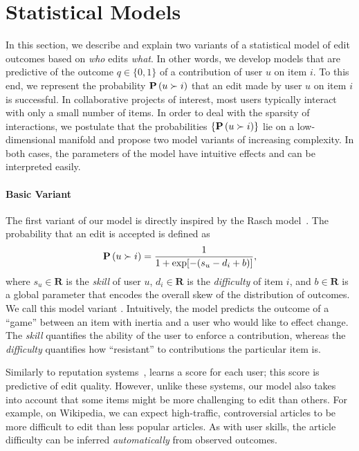 \section{Statistical Models}
\label{pps:sec:models}

In this section, we describe and explain two variants of a statistical model of edit outcomes based on \emph{who} edits \emph{what}.
In other words, we develop models that are predictive of the outcome $q \in \{0, 1\}$ of a contribution of user $u$ on item $i$.
To this end, we represent the probability $\mathbf{P}\left( u \succ i \right)$ that an edit made by user $u$ on item $i$ is successful.
In collaborative projects of interest, most users typically interact with only a small number of items.
In order to deal with the sparsity of interactions, we postulate that the probabilities $\{ \mathbf{P}\left( u \succ i \right) \}$ lie on a low-dimensional manifold and propose two model variants of increasing complexity.
In both cases, the parameters of the model have intuitive effects and can be interpreted easily.

\paragraph{Basic Variant}
The first variant of our model is directly inspired by the Rasch model~\citep{rasch1960probabilistic}.
The probability that an edit is accepted is defined as
\begin{align}
	\label{pps:eq:basicmodel}
	\mathbf{P}\left( u \succ i \right) = \frac{1}{1 + \exp[-(s_u - d_i + b)]},
\end{align}
where $s_u\in\mathbf{R}$ is the \emph{skill} of user $u$, $d_i\in\mathbf{R}$ is the \emph{difficulty} of item $i$, and $b \in \mathbf{R}$ is a global parameter that encodes the overall skew of the distribution of outcomes.
We call this model variant .
Intuitively, the model predicts the outcome of a ``game'' between an item with inertia and a user who would like to effect change.
The \emph{skill} quantifies the ability of the user to enforce a contribution, whereas the \emph{difficulty} quantifies how ``resistant'' to contributions the particular item is.

Similarly to reputation systems~\citep{adler2007content},  learns a score for each user; this score is predictive of edit quality.
However, unlike these systems, our model also takes into account that some items might be more challenging to edit than others.
For example, on Wikipedia, we can expect high-traffic, controversial articles to be more difficult to edit than less popular articles.
As with user skills, the article difficulty can be inferred \emph{automatically} from observed outcomes.

